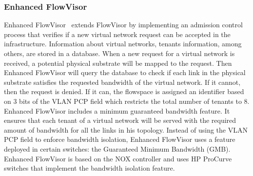 \subsubsection{Enhanced FlowVisor}
Enhanced FlowVisor~\cite{EnhancedFV-Min2012} extends FlowVisor by implementing an admission control process that verifies if a new virtual network request can be accepted in the infrastructure. 
Information about virtual networks, tenants information, among others, are stored in a database. When a new request for a virtual network is received, a potential physical substrate will be mapped to the request. Then Enhanced FlowVisor will query the database to check if each link in the physical substrate satisfies the requested bandwidth of the virtual network. If it cannot, then the request is denied. 
If it can, the flowspace is assigned an identifier based on 3 bits of the VLAN PCP field which restricts the total number of tenants to 8.
Enhanced FlowVisor includes a minimum guaranteed bandwidth feature. It ensures that each tenant of a virtual network will be served with the required amount of bandwidth for all the links in his topology.
Instead of using the VLAN PCP field to enforce bandwidth isolation, Enhanced FlowVisor uses a feature deployed in certain switches: the Guaranteed Minimum Bandwidth (GMB).
Enhanced FlowVisor is based on the NOX controller and uses HP ProCurve switches that implement the bandwidth isolation feature.

